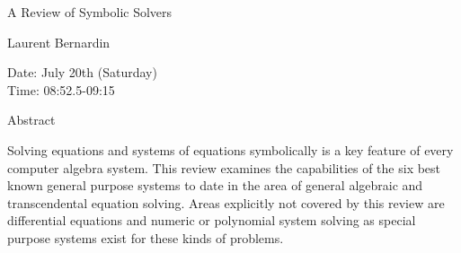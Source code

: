 \begin{center}
\LARGE
A Review of Symbolic Solvers

\end{center}

\begin{center}
\Large
Laurent Bernardin

\end{center}

\noindent
Date:  July 20th (Saturday) \\
Time:  08:52.5-09:15\\

\begin{center}
\large
Abstract
\end{center}

Solving equations and systems of equations symbolically is a key feature of every computer
algebra system. This review examines the capabilities of the six best known general purpose
systems to date in the area of general algebraic and transcendental equation solving. Areas
explicitly not covered by this review are differential equations and numeric or polynomial system
solving as special purpose systems exist for these kinds of problems. 

